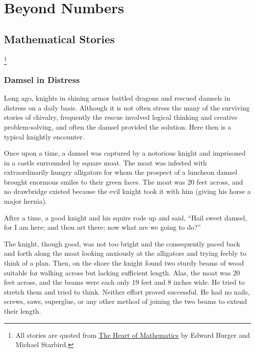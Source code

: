 \pagestyle{fancy}
\cleartooddpage

\chapter{Beyond Numbers}\label{ch:infinity}

%
\section{Mathematical Stories}\footnote{All stories are quoted from \underline{The Heart of Mathematics} by Edward Burger and Michael Starbird.} \label{sec:Stories}

\newif\ifnudges

\subsection{Damsel in Distress}

Long ago, knights in shining armor battled dragons and rescued damsels in distress on a daily basis. Although it is not often stress the many of the surviving stories of chivalry, frequently the rescue involved logical thinking and creative problem-solving, and often the damsel provided the solution. Here then is a typical knightly encounter.

Once upon a time, a damsel was captured by a notorious knight and imprisoned in a castle surrounded by square moat. The moat was infested with extraordinarily hungry alligators for whom the prospect of a luncheon damsel brought enormous smiles to their green faces. The moat was 20 feet across, and no drawbridge existed because the evil knight took it with him (giving his horse a major hernia).

After a time, a good knight and his squire rode up and said, ``Hail sweet damsel, for I am here; and thou art there; now what are we going to do?''

The knight, though good, was not too bright and the consequently paced back and forth along the moat looking anxiously at the alligators and trying feebly to think of a plan. Then, on the shore the knight found two sturdy beams of wood suitable for walking across but lacking sufficient length. Alas, the moat was 20 feet across, and the beams were each only 19 feet and 8 inches wide. He tried to stretch them and tried to think. Neither effort proved successful. He had no nails, screws, saws, superglue, or any other method of joining the two beams to extend their length.

